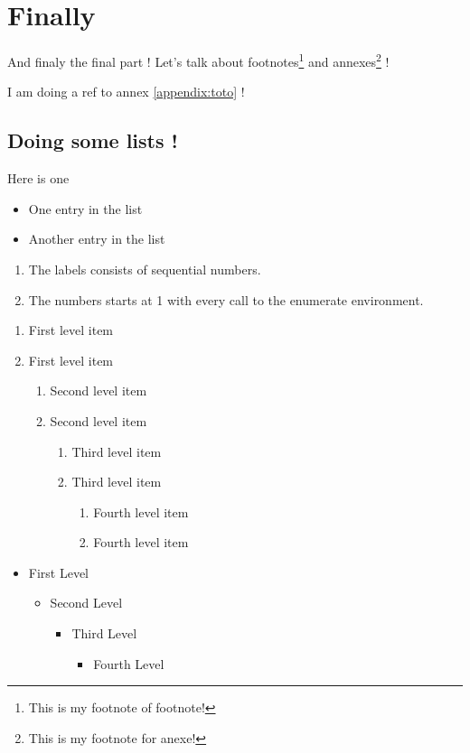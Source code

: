 \chapter{Finally}

And finaly the final part !
Let's talk about footnotes\footnote{This is my footnote of footnote!} and annexes\footnote{This is my footnote for anexe!} !

I am doing a ref to annex \ref{appendix:toto} !

\section{Doing some lists !}

Here is one \\
\begin{itemize}
  \item One entry in the list
  \item Another entry in the list
\end{itemize} 


\begin{enumerate}
  \item The labels consists of sequential numbers.
  \item The numbers starts at 1 with every call to the enumerate environment.
\end{enumerate}

\begin{enumerate}
   \item First level item
   \item First level item
   \begin{enumerate}
     \item Second level item
     \item Second level item
     \begin{enumerate}
       \item Third level item
       \item Third level item
       \begin{enumerate}
         \item Fourth level item
         \item Fourth level item
       \end{enumerate}
     \end{enumerate}
   \end{enumerate}
 \end{enumerate}
 
 \begin{itemize}
   \item  First Level
   \begin{itemize}
     \item  Second Level
     \begin{itemize}
       \item  Third Level
       \begin{itemize}
         \item  Fourth Level
       \end{itemize}
     \end{itemize}
   \end{itemize}
 \end{itemize}
 
